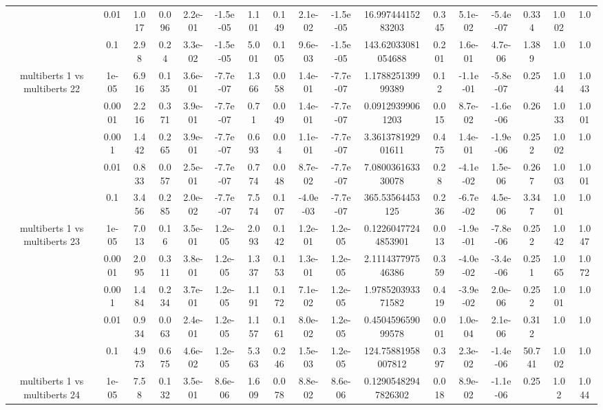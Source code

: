 \begin{tabular}{|c|c|c|c|c|c|c|c|c|c|c|c|c|c|c|c|c|}
 & 0.01 & 1.017 & 0.096 & 2.2e-01 & -1.5e-05 & 1.101 & 0.149 & 2.1e-02 & -1.5e-05 & 16.99744415283203 & 0.345 & 5.1e-02 & -5.4e-07 & 0.334 & 1.002 & 1.0 \\
 & 0.1 & 2.98 & 0.24 & 3.3e-02 & -1.5e-05 & 5.001 & 0.105 & 9.6e-03 & -1.5e-05 & 143.62033081054688 & 0.201 & 1.6e-01 & 4.7e-06 & 1.389 & 1.0 & 1.0 \\
\hline
\multirow{5}{*}{multiberts 1 vs multiberts 22} & 1e-05 & 6.916 & 0.135 & 3.6e-01 & -7.7e-07 & 1.366 & 0.058 & 1.4e-01 & -7.7e-07 & 1.178825139999389 & 0.12 & -1.1e-01 & -5.8e-07 & 0.25 & 1.044 & 1.043 \\
 & 0.0001 & 2.216 & 0.371 & 3.9e-01 & -7.7e-07 & 0.71 & 0.049 & 1.4e-01 & -7.7e-07 & 0.09129399061203 & 0.015 & 8.7e-02 & -1.6e-06 & 0.26 & 1.033 & 1.001 \\
 & 0.001 & 1.442 & 0.265 & 3.9e-01 & -7.7e-07 & 0.693 & 0.04 & 1.1e-01 & -7.7e-07 & 3.361378192901611 & 0.475 & 1.4e-01 & -1.9e-06 & 0.252 & 1.002 & 1.0 \\
 & 0.01 & 0.833 & 0.057 & 2.5e-01 & -7.7e-07 & 0.774 & 0.048 & 8.7e-02 & -7.7e-07 & 7.080036163330078 & 0.28 & -4.1e-02 & 1.5e-06 & 0.267 & 1.003 & 1.001 \\
 & 0.1 & 3.456 & 0.285 & 2.0e-02 & -7.7e-07 & 7.574 & 0.107 & -4.0e-03 & -7.7e-07 & 365.53564453125 & 0.236 & -6.7e-02 & 4.5e-06 & 3.347 & 1.001 & 1.0 \\
\hline
\multirow{5}{*}{multiberts 1 vs multiberts 23} & 1e-05 & 7.013 & 0.16 & 3.5e-01 & 1.2e-05 & 2.093 & 0.142 & 1.2e-01 & 1.2e-05 & 0.12260477244853901 & 0.013 & -1.9e-01 & -7.8e-06 & 0.252 & 1.042 & 1.047 \\
 & 0.0001 & 2.095 & 0.311 & 3.8e-01 & 1.2e-05 & 1.337 & 0.153 & 1.3e-01 & 1.2e-05 & 2.111437797546386 & 0.359 & -4.0e-02 & -3.4e-06 & 0.251 & 1.065 & 1.072 \\
 & 0.001 & 1.484 & 0.234 & 3.7e-01 & 1.2e-05 & 1.191 & 0.172 & 7.1e-02 & 1.2e-05 & 1.978520393371582 & 0.419 & -3.9e-02 & 2.0e-06 & 0.252 & 1.001 & 1.0 \\
 & 0.01 & 0.934 & 0.063 & 2.4e-01 & 1.2e-05 & 1.157 & 0.161 & 8.0e-02 & 1.2e-05 & 0.450459659099578 & 0.001 & 1.0e-04 & 2.1e-06 & 0.312 & 1.0 & 1.0 \\
 & 0.1 & 4.973 & 0.675 & 4.6e-02 & 1.2e-05 & 5.363 & 0.246 & 1.5e-03 & 1.2e-05 & 124.75881958007812 & 0.397 & 2.3e-02 & -1.4e-06 & 50.741 & 1.002 & 1.0 \\
\hline
\multirow{5}{*}{multiberts 1 vs multiberts 24} & 1e-05 & 7.58 & 0.132 & 3.5e-01 & 8.6e-06 & 1.609 & 0.078 & 8.8e-02 & 8.6e-06 & 0.12905482947826302 & 0.018 & 8.9e-02 & -1.1e-06 & 0.25 & 1.02 & 1.044 \\

\end{tabular}
